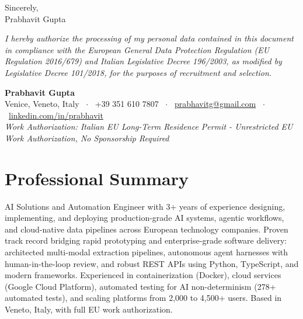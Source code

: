 \documentclass[10pt,a4paper]{article}
\begin{document}
\vspace{0.4em}
Sincerely,\\
Prabhavit Gupta

\vspace{1.2em}
\noindent\textit{\small I hereby authorize the processing of my personal data contained in this document in compliance with the European General Data Protection Regulation (EU Regulation 2016/679) and Italian Legislative Decree 196/2003, as modified by Legislative Decree 101/2018, for the purposes of recruitment and selection.}

\newpage


\begin{center}
    {\LARGE \textbf{Prabhavit Gupta}}\\[3pt]
    Venice, Veneto, Italy \ $\cdot$ \ +39 351 610 7807 \ $\cdot$ \ \href{mailto:prabhavitg@gmail.com}{prabhavitg@gmail.com} \ $\cdot$ \ \href{https://www.linkedin.com/in/prabhavit}{linkedin.com/in/prabhavit}\\[2pt]
    {\footnotesize \textit{Work Authorization: Italian EU Long-Term Residence Permit - Unrestricted EU Work Authorization, No Sponsorship Required}}
\end{center}

\vspace{-0.5em}
\section*{Professional Summary}
AI Solutions and Automation Engineer with 3+ years of experience designing, implementing, and deploying production-grade AI systems, agentic workflows, and cloud-native data pipelines across European technology companies. Proven track record bridging rapid prototyping and enterprise-grade software delivery: architected multi-modal extraction pipelines, autonomous agent harnesses with human-in-the-loop review, and robust REST APIs using Python, TypeScript, and modern frameworks. Experienced in containerization (Docker), cloud services (Google Cloud Platform), automated testing for AI non-determinism (278+ automated tests), and scaling platforms from 2,000 to 4,500+ users. Based in Veneto, Italy, with full EU work authorization.
\end{document}
